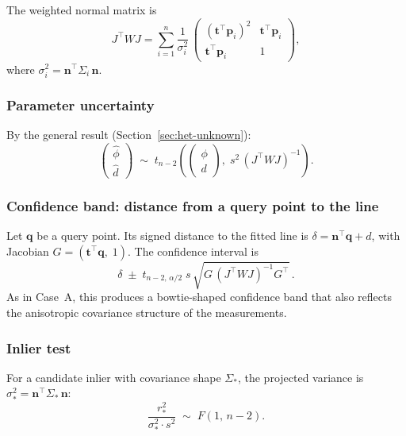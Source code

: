 \documentclass[11pt]{article}
\begin{document}
The weighted normal matrix is
\begin{equation}
  \boxed{
    J^\top W J
    = \sum_{i=1}^n \frac{1}{\sigma_i^2}\,
      \begin{pmatrix}
        (\mathbf{t}^\top \mathbf{p}_i)^2 & \mathbf{t}^\top \mathbf{p}_i \\
        \mathbf{t}^\top \mathbf{p}_i & 1
      \end{pmatrix},
  }
\end{equation}
where $\sigma_i^2 = \mathbf{n}^\top \Sigma_i\, \mathbf{n}$.

\subsubsection{Parameter uncertainty}

By the general result (Section~\ref{sec:het-unknown}):
\begin{equation}
  \boxed{
    \begin{pmatrix} \hat\phi \\ \hat{d} \end{pmatrix}
    \;\sim\; t_{n-2}\!\left(
      \begin{pmatrix} \phi \\ d \end{pmatrix},\;
      s^2\, (J^\top W J)^{-1}
    \right).
  }
\end{equation}

\subsubsection{Confidence band: distance from a query point to the line}

Let $\mathbf{q}$ be a query point. Its signed distance to the fitted line is
$\delta = \mathbf{n}^\top \mathbf{q} + d$,
with Jacobian
$G = (\mathbf{t}^\top \mathbf{q},\; 1)$.
The confidence interval is
\begin{equation}
  \boxed{
    \delta \;\pm\; t_{n-2,\,\alpha/2}\;
    s\, \sqrt{G\, (J^\top W J)^{-1} G^\top}\,.
  }
\end{equation}
As in Case~A, this produces a bowtie-shaped confidence band that
also reflects the anisotropic covariance structure of the measurements.

\subsubsection{Inlier test}

For a candidate inlier with covariance shape $\Sigma_*$,
the projected variance is $\sigma_*^2 = \mathbf{n}^\top \Sigma_*\, \mathbf{n}$:
\begin{equation}
  \boxed{
    \frac{r_*^2}{\sigma_*^2 \cdot s^2} \;\sim\; F(1,\, n-2).
  }
\end{equation}
\end{document}

